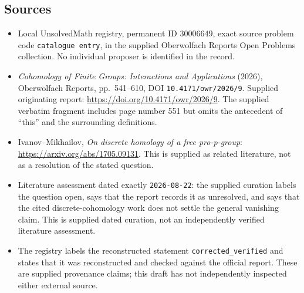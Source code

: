 \documentclass[11pt]{article}
\begin{document}
\subsection{Sources}
\begin{itemize}
\item Local UnsolvedMath registry, permanent ID \(30006649\), exact source problem code \texttt{catalogue entry}, in the supplied Oberwolfach Reports Open Problems collection. No individual proposer is identified in the record.
\item \emph{Cohomology of Finite Groups: Interactions and Applications} (2026), Oberwolfach Reports, pp.\ 541--610, DOI \texttt{10.4171/owr/2026/9}. Supplied originating report: \url{https://doi.org/10.4171/owr/2026/9}. The supplied verbatim fragment includes page number 551 but omits the antecedent of ``this'' and the surrounding definitions.
\item Ivanov--Mikhailov, \emph{On discrete homology of a free pro-p-group}: \url{https://arxiv.org/abs/1705.09131}. This is supplied as related literature, not as a resolution of the stated question.
\item Literature assessment dated exactly \texttt{2026-08-22}: the supplied curation labels the question open, says that the report records it as unresolved, and says that the cited discrete-cohomology work does not settle the general vanishing claim. This is supplied dated curation, not an independently verified literature assessment.
\item The registry labels the reconstructed statement \texttt{corrected\_verified} and states that it was reconstructed and checked against the official report. These are supplied provenance claims; this draft has not independently inspected either external source.
\end{itemize}
\end{document}
